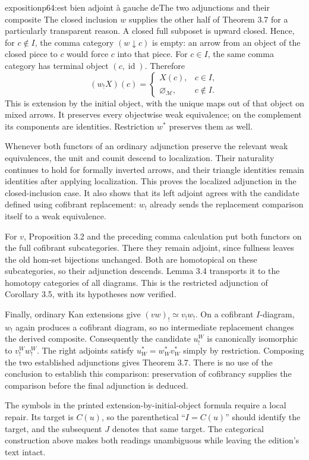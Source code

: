 \begin{dcomment}{exposition}{p64:est bien adjoint à gauche de}{The two adjunctions and their composite}
The closed inclusion $w$ supplies the other half of Theorem 3.7 for a particularly transparent reason. A closed full subposet is upward closed. Hence, for $c\notin I$, the comma category $(w\downarrow c)$ is empty: an arrow from an object of the closed piece to $c$ would force $c$ into that piece. For $c\in I$, the same comma category has terminal object $(c,\operatorname{id})$. Therefore
\[
 (w_!X)(c)=
 \begin{cases}X(c),&c\in I,\\ \varnothing_{\mathcal M},&c\notin I.
 \end{cases}
\]
This is extension by the initial object, with the unique maps out of that object on mixed arrows. It preserves every objectwise weak equivalence; on the complement its components are identities. Restriction $w^*$ preserves them as well.

Whenever both functors of an ordinary adjunction preserve the relevant weak equivalences, the unit and counit descend to localization. Their naturality continues to hold for formally inverted arrows, and their triangle identities remain identities after applying localization. This proves the localized adjunction in the closed-inclusion case. It also shows that its left adjoint agrees with the candidate defined using cofibrant replacement: $w_!$ already sends the replacement comparison itself to a weak equivalence.

For $v$, Proposition 3.2 and the preceding comma calculation put both functors on the full cofibrant subcategories. There they remain adjoint, since fullness leaves the old hom-set bijections unchanged. Both are homotopical on these subcategories, so their adjunction descends. Lemma 3.4 transports it to the homotopy categories of all diagrams. This is the restricted adjunction of Corollary 3.5, with its hypotheses now verified.

Finally, ordinary Kan extensions give $(vw)_!\simeq v_!w_!$. On a cofibrant $I$-diagram, $w_!$ again produces a cofibrant diagram, so no intermediate replacement changes the derived composite. Consequently the candidate $u_!^W$ is canonically isomorphic to $v_!^Ww_!^W$. The right adjoints satisfy $u_W^*=w_W^*v_W^*$ simply by restriction. Composing the two established adjunctions gives Theorem 3.7. There is no use of the conclusion to establish this comparison: preservation of cofibrancy supplies the comparison before the final adjunction is deduced.

The symbols in the printed extension-by-initial-object formula require a local repair. Its target is $C(u)$, so the parenthetical ``$I=C(u)$'' should identify the target, and the subsequent $J$ denotes that same target. The categorical construction above makes both readings unambiguous while leaving the edition's text intact.
\end{dcomment}

